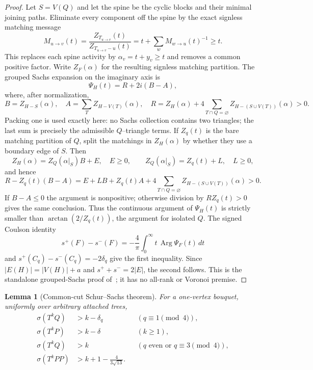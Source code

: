 \documentclass[11pt]{article}
\newtheorem{lemma}[theorem]{Lemma}
\newcommand{\spE}{s^+}
\newcommand{\smE}{s^-}
\newcommand{\sig}{\sigma}
\begin{document}
\begin{proof}
Let $S=V(Q)$ and let the spine be the cyclic blocks and their minimal joining
paths.  Eliminate every component off the spine by the exact signless matching
message
\[
 M_{u\to v}(t)=\frac{Z_{T_{u\to v}}(t)}{Z_{T_{u\to v}-u}(t)}
 =t+\sum_wM_{w\to u}(t)^{-1}\geq t.
\]
This replaces each spine activity by $\alpha_v=t+y_v\geq t$ and removes a
common positive factor.  Write $Z_F(\alpha)$ for the resulting signless
matching partition.  The grouped Sachs expansion on the imaginary axis is
\[
 \Psi_H(t)=R+2i(B-A),
\]
where, after normalization,
\[
 B=Z_{H-S}(\alpha),\quad A=\sum_T Z_{H-V(T)}(\alpha),\quad
 R=Z_H(\alpha)+4\!\sum_{T\cap Q=\varnothing}
 Z_{H-(S\cup V(T))}(\alpha)>0.
\]
Packing one is used exactly here: no Sachs collection contains two triangles;
the last sum is precisely the admissible $Q$--triangle terms.  If $Z_q(t)$ is
the bare matching partition of $Q$, split the matchings in $Z_H(\alpha)$ by
whether they use a boundary edge of $S$.  Then
\[
 Z_H(\alpha)=Z_Q(\alpha|_S)B+E,\quad E\geq0,
 \qquad Z_Q(\alpha|_S)=Z_q(t)+L,\quad L\geq0,
\]
and hence
\[
 R-Z_q(t)(B-A)=E+LB+Z_q(t)A
 +4\!\sum_{T\cap Q=\varnothing}Z_{H-(S\cup V(T))}(\alpha)>0.
\]
If $B-A\leq0$ the argument is nonpositive; otherwise division by
$RZ_q(t)>0$ gives the same conclusion.  Thus the continuous argument of
$\Psi_H(t)$ is strictly smaller than $\arctan(2/Z_q(t))$, the argument for
isolated $Q$.  The signed Coulson identity
\[
 \spE(F)-\smE(F)=-\frac4\pi\int_0^\infty t\,\operatorname{Arg}\Psi_F(t)\,dt
\]
and $\spE(C_q)-\smE(C_q)=-2\delta_q$ give the first inequality.
Since $|E(H)|=|V(H)|+a$ and $\spE+\smE=2|E|$, the second follows.  This is the
standalone grouped-Sachs proof of~\cite{PackingOne}; it has no all-rank or
Voronoi premise.
\end{proof}

\begin{lemma}[Common-cut Schur--Sachs theorem]\label{lem:common-cut}
For a one-vertex bouquet, uniformly over arbitrary attached trees,
\begin{align}
 \sig(T^kQ)&>k-\delta_q &&(q\equiv1\pmod4),\label{eq:ccq}\\
 \sig(T^kP)&>k-\delta &&(k\geq1),\label{eq:ccp}\\
 \sig(T^kQ)&>k &&(q\text{ even or }q\equiv3\pmod4),\label{eq:ccqgood}\\
 \sig(T^kPP)&>k+1-\frac4{3\sqrt{13}}.\label{eq:ccpp}
\end{align}
\end{lemma}
\end{document}
